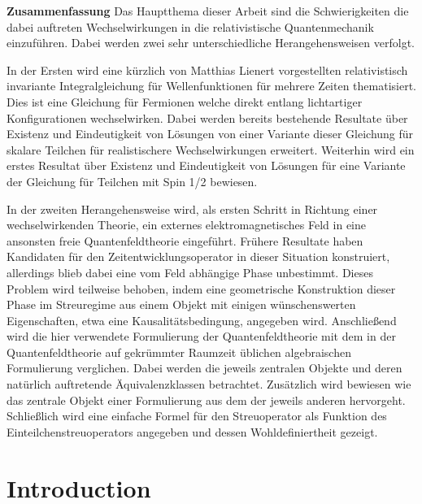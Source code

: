 \documentclass[b5paper,draft,openbib,12pt]{memoir}
\begin{document}
{\large \textbf{Zusammenfassung}}
Das Hauptthema dieser Arbeit sind die Schwierigkeiten die 
dabei auftreten Wechselwirkungen in die relativistische 
Quantenmechanik einzuführen. Dabei werden zwei sehr unterschiedliche
Herangehensweisen verfolgt.

In der Ersten wird eine kürzlich von Matthias Lienert vorgestellten 
relativistisch invariante Integralgleichung für Wellenfunktionen 
für mehrere Zeiten thematisiert. Dies ist eine Gleichung für 
Fermionen welche direkt entlang lichtartiger Konfigurationen 
wechselwirken. Dabei werden bereits bestehende Resultate über 
Existenz und Eindeutigkeit von Lösungen von einer Variante dieser 
Gleichung für skalare Teilchen für realistischere Wechselwirkungen
erweitert. Weiterhin wird ein erstes Resultat über Existenz und 
Eindeutigkeit von Lösungen für eine Variante der Gleichung 
für Teilchen mit Spin 1/2 bewiesen.

In der zweiten Herangehensweise wird, als ersten Schritt in 
Richtung einer wechselwirkenden Theorie, ein externes 
elektromagnetisches Feld in eine ansonsten freie Quantenfeldtheorie
eingeführt. Frühere Resultate haben Kandidaten für den 
Zeitentwicklungsoperator in dieser Situation konstruiert, 
allerdings blieb dabei eine vom Feld abhängige Phase unbestimmt.
Dieses Problem wird teilweise behoben, indem eine geometrische 
Konstruktion dieser Phase im Streuregime aus einem 
Objekt mit einigen wünschenswerten Eigenschaften, 
etwa eine Kausalitätsbedingung, angegeben wird. 
Anschließend wird die hier verwendete Formulierung der 
Quantenfeldtheorie mit dem in der Quantenfeldtheorie auf 
gekrümmter Raumzeit üblichen algebraischen Formulierung 
verglichen. Dabei werden die jeweils zentralen Objekte
 und deren 
natürlich auftretende Äquivalenzklassen betrachtet.
Zusätzlich wird bewiesen wie das zentrale Objekt einer 
Formulierung aus dem der jeweils anderen hervorgeht. 
Schließlich wird eine einfache Formel für den Streuoperator 
als Funktion des Einteilchenstreuoperators angegeben und
dessen Wohldefiniertheit gezeigt.





\tableofcontents

\newpage



\mainmatter

\chapter{Introduction}
\end{document}
